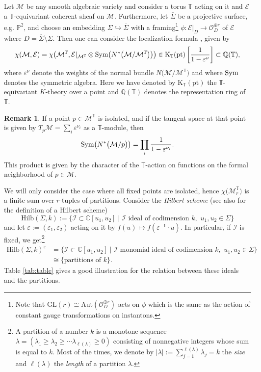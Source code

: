 \documentclass[11pt,colorinlistoftodos]{amsart}
\numberwithin{equation}{subsection}
\theoremstyle{plain}
\theoremstyle{definition}
\newtheorem{rem}[thm]{Remark}
\theoremstyle{remark}
\newcommand{\Q}{\mathbb{Q}}
\newcommand{\C}{\mathbb{C}}
\newcommand{\calI}{\mathcal{I}}
\newcommand{\calO}{\mathcal{O}}
\newcommand{\calM}{\mathcal{M}}
\newcommand{\calE}{\mathcal{E}}
\newcommand{\Sym}{\textnormal{Sym}}
\begin{document}
Let $\calM$ be any smooth algebraic variety and consider a torus $\mathbb{T}$ acting on it and $\calE$ a $\mathbb{T}$-equivariant coherent sheaf on $\calM$. Furthermore, let $\overline{\Sigma}$ be a projective surface, e.g. $\mathbb{P}^2$, and choose an embedding $\Sigma\hookrightarrow \overline{\Sigma}$ with a framing\footnote{Note that $\mathrm{GL}(r)\cong\mathrm{Aut}(\calO^{\oplus r}_D)$ acts on $\phi$ which is the same as the action of constant gauge transformations on instantons.} $\phi\colon\calE\vert_D\to \calO_D^{\oplus r}$ of $\calE$ where $D=\overline{\Sigma}\setminus \Sigma$. Then one can consider the localization formula \cite{ChrissGinzburg1997}, given by 
\[
\chi(\calM,\mathcal{E})=\chi\big(\calM^\mathbb{T},\mathcal{E}\vert_{\calM^\mathbb{T}}\otimes \Sym\big(N^*\big(\calM/\calM^\mathbb{T}\big)\big)\big)\in \mathrm{K}_\mathbb{T}(\mathrm{pt})\left[\frac{1}{1-\varepsilon^\nu}\right]\subset \Q(\mathbb{T}),
\]
where $\varepsilon^\nu$ denote the weights of the normal bundle $N\big(\calM/\calM^\mathbb{T}\big)$ and where $\Sym$ denotes the symmetric algebra. Here we have denoted by $\mathrm{K}_\mathbb{T}(\mathrm{pt})$ the $\mathbb{T}$-equivariant $K$-theory over a point and $\Q(\mathbb{T})$ denotes the representation ring of $\mathbb{T}$.
\begin{rem}
If a point $p\in \calM^\mathbb{T}$ is isolated, and if the tangent space at that point is given by $T_p\calM=\sum_i \varepsilon^{\nu_i}$ as a $\mathbb{T}$-module, then 
\[
\Sym\big(N^*\big(\calM/p\big)\big)=\prod_i \frac{1}{1-\varepsilon^{\nu_i}}.
\]
This product is given by the character of the $\mathbb{T}$-action on functions on the formal neighborhood of $p\in\calM$.
\end{rem}
We will only consider the case where all fixed points are isolated, hence $\chi\big(\calM_r^\mathbb{T}\big)$ is a finite sum over $r$-tuples of partitions. 
Consider the \emph{Hilbert scheme} (see also \cite{Nakajima1999} for the definition of a Hilbert scheme)
\[
\mathrm{Hilb}(\Sigma,k):=\{\calI\subset \C[u_1,u_2] \mid \text{$\calI$ ideal of codimension $k$},\,\, u_1,u_2\in\Sigma\}
\]
and let $\varepsilon:=(\varepsilon_1,\varepsilon_2)$ acting on it by $f(u)\mapsto f(\varepsilon^{-1}\cdot u)$. In particular, if $\calI$ is fixed, we get\footnote{A partition of a number $k$ is a monotone sequence $\lambda=(\lambda_1\geq\lambda_2\geq\dotsm \lambda_{\ell(\lambda)}\geq 0)$ consisting of nonnegative integers whose sum is equal to $k$. Most of the times, we denote by $\vert\lambda\vert:=\sum_{j=1}^{\ell(\lambda)}\lambda_j=k$ the \emph{size} and $\ell(\lambda)$ the \emph{length} of a partition $\lambda$.} 
\begin{align*}
\mathrm{Hilb}(\Sigma,k)^\varepsilon&=\{\calI\subset \C[u_1,u_2]\mid \text{$\calI$ monomial ideal of codimension $k$},\,\, u_1,u_2\in\Sigma\}\\
&\cong\{\text{partitions of $k$}\}.
\end{align*}
Table \ref{tab:table} gives a good illustration for the relation between these ideals and the partitions.
\end{document}
